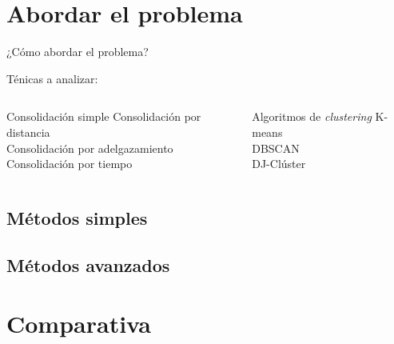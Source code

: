\documentclass[10pt, spanish]{beamer}
\begin{document}
\section{Abordar el problema}
\begin{frame}{¿C\'omo abordar el problema?}

T\'enicas a analizar:

  \begin{columns}[T,onlytextwidth]
    
      \begin{exampleblock}{Consolidaci\'on simple}
        Consolidaci\'on por distancia\\
        Consolidaci\'on por adelgazamiento\\
        Consolidaci\'on por tiempo
      \end{exampleblock}


      \begin{exampleblock}{Algoritmos de \textit{clustering}}
        K-means\\
        DBSCAN\\
        DJ-Cl\'uster
      \end{exampleblock}

  \end{columns}


\end{frame}


\subsection{M\'etodos simples}
\begin{frame}

\end{frame}

\subsection{M\'etodos avanzados}
\begin{frame}

\end{frame}


\section{Comparativa}
\begin{frame}

\end{frame}
\end{document}
